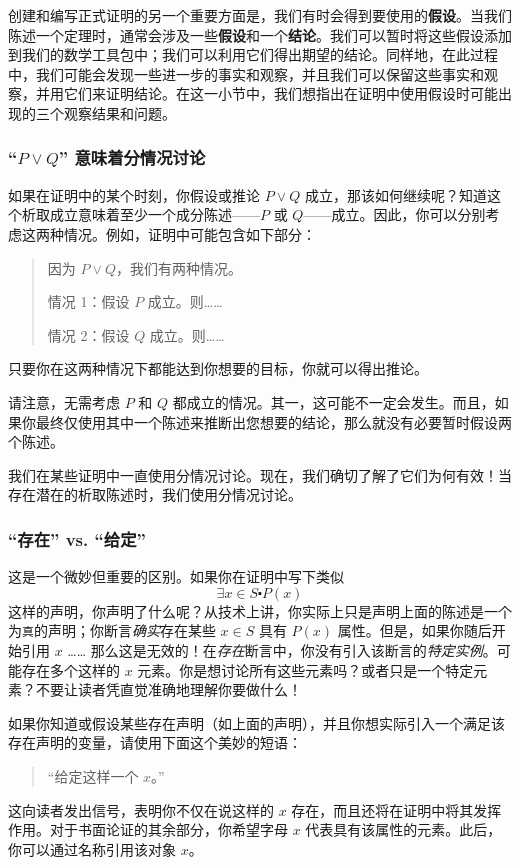 创建和编写正式证明的另一个重要方面是，我们有时会得到要使用的\textbf{假设}。当我们陈述一个定理时，通常会涉及一些\textbf{假设}和一个\textbf{结论}。我们可以暂时将这些假设添加到我们的数学工具包中；我们可以利用它们得出期望的结论。同样地，在此过程中，我们可能会发现一些进一步的事实和观察，并且我们可以保留这些事实和观察，并用它们来证明结论。在这一小节中，我们想指出在证明中使用假设时可能出现的三个观察结果和问题。

\subsubsection*{``$P \lor Q$'' 意味着分情况讨论}

如果在证明中的某个时刻，你假设或推论 $P \lor Q$ 成立，那该如何继续呢？知道这个析取成立意味着至少一个成分陈述——$P$ 或 $Q$——成立。因此，你可以分别考虑这两种情况。例如，证明中可能包含如下部分：
\begin{quote}
    因为 $P \lor Q$，我们有两种情况。

    \qquad 情况 1：假设 $P$ 成立。则……

    \qquad 情况 2：假设 $Q$ 成立。则……
\end{quote}
只要你在这两种情况下都能达到你想要的目标，你就可以得出推论。

请注意，无需考虑 $P$ 和 $Q$ 都成立的情况。其一，这可能不一定会发生。而且，如果你最终仅使用其中一个陈述来推断出您想要的结论，那么就没有必要暂时假设两个陈述。

我们在某些证明中一直使用分情况讨论。现在，我们确切了解了它们为何有效！当存在潜在的析取陈述时，我们使用分情况讨论。

\subsubsection*{``存在'' vs. ``给定''}

这是一个微妙但重要的区别。如果你在证明中写下类似
\[\exists x \in S \centerdot P(x)\]
这样的声明，你声明了什么呢？从技术上讲，你实际上只是声明上面的陈述是一个为\verb|真|的声明；你断言\emph{确实}存在某些 $x \in S$ 具有 $P(x)$ 属性。但是，如果你随后开始引用 $x$ …… 那么这是无效的！在\emph{存在}断言中，你没有引入该断言的\emph{特定实例}。可能存在多个这样的 $x$ 元素。你是想讨论所有这些元素吗？或者只是一个特定元素？不要让读者凭直觉准确地理解你要做什么！

如果你知道或假设某些存在声明（如上面的声明），并且你想实际引入一个满足该存在声明的变量，请使用下面这个美妙的短语：
\begin{quote}
    ``给定这样一个 $x$。''
\end{quote}
这向读者发出信号，表明你不仅在说这样的 $x$ 存在，而且还将在证明中将其发挥作用。对于书面论证的其余部分，你希望字母 $x$ 代表具有该属性的元素。此后，你可以通过名称引用该对象 $x$。

